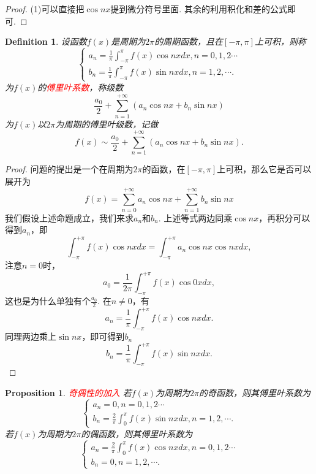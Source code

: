 \documentclass{article}
\newtheorem{proposition}[theorem]{Proposition}
\newtheorem{definition}[theorem]{Definition}
\newcommand{\redt}[1]{\textcolor{red}{#1}}
\begin{document}
\begin{proof}
\rm (1)可以直接把$\cos nx$提到微分符号里面. 其余的利用积化和差的公式即可. 
\end{proof}

\begin{definition}
\rm 设函数$f(x)$是周期为$2\pi$的周期函数，且在$[-\pi,\pi]$上可积，则称
$$
\left\{
\begin{array}{ll}
a_n = \frac{1}{\pi} \int_{-\pi}^{\pi} f(x)\cos nxdx, n =  0,1,2\cdots \\
b_n = \frac{1}{\pi} \int_{-\pi}^{\pi} f(x)\sin nxdx, n = 1,2,\cdots.
\end{array} \right.
$$
为$f(x)$的\redt{傅里叶系数}，称级数
$$
\frac{a_0}{2} + \sum\limits_{n=1}^{+\infty}(a_n\cos nx + b_n \sin nx)
$$
为$f(x)$以$2\pi$为周期的傅里叶级数，记做
$$
f(x) \sim \frac{a_0}{2} +  \sum\limits_{n=1}^{+\infty}(a_n\cos nx + b_n \sin nx).
$$
\end{definition}

\begin{proof}
\rm 问题的提出是一个在周期为$2\pi$的函数，在$[-\pi,\pi]$上可积，那么它是否可以展开为
$$
f(x) =\sum\limits_{n=0}^{+\infty}a_n\cos nx + \sum\limits_{n=1}^{+\infty}b_n\sin nx
$$
我们假设上述命题成立，我们来求$a_n$和$b_n$. 上述等式两边同乘$\cos nx$，再积分可以得到$a_n$，即
$$
\int_{-\pi}^{+\pi} f(x) \cos nxdx = \int_{-\pi}^{+\pi} a_n\cos nx\cos nx dx,
$$
注意$n=0$时，
$$
a_0 = \frac{1}{2\pi} \int_{-\pi}^{+\pi} f(x) \cos 0xdx,
$$
这也是为什么单独有个$\frac{a_0}{2}$. 在$n \neq 0$，有
$$
a_n= \frac{1}{\pi} \int_{-\pi}^{+\pi} f(x) \cos nx dx.
$$
同理两边乘上$\sin nx$，即可得到$b_n$
$$
b_n = \frac{1}{\pi} \int_{-\pi}^{+\pi} f(x) \sin nx dx.
$$
\end{proof}

\begin{proposition}
\rm \redt{奇偶性的加入} 若$f(x)$为周期为$2\pi$的奇函数，则其傅里叶系数为
$$
\left\{
\begin{array}{ll}
a_n = 0, n =  0,1,2\cdots \\
b_n = \frac{2}{\pi} \int_{0}^{\pi} f(x)\sin nxdx, n = 1,2,\cdots.
\end{array} \right.
$$
若$f(x)$为周期为$2\pi$的偶函数，则其傅里叶系数为
$$
\left\{
\begin{array}{ll}
a_n = \frac{2}{\pi} \int_{0}^{\pi} f(x)\cos nxdx, n =  0,1,2\cdots \\
b_n = 0 , n = 1,2,\cdots.
\end{array} \right.
$$
\end{proposition}
\end{document}
